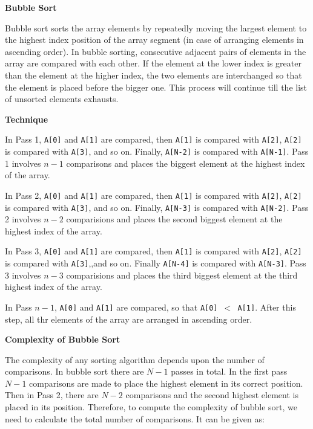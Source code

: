 \filbreak
\vskip 1cm
{\bf Bubble Sort}

\vskip 1mm
Bubble sort sorts the array elements by repeatedly moving the largest element to the highest index position of the array segment (in case of arranging elements in ascending order). In bubble sorting, consecutive adjacent pairs of elements in the array are compared with each other. If the element at the lower index is greater than the element at the higher index, the two elements are interchanged so that the element is placed before the bigger one. This process will continue till the list of unsorted elements exhausts.

\vskip 3mm
{\bf Technique}

\vskip 1mm
 In Pass 1, {\tt A[0]} and {\tt A[1]} are compared, then {\tt A[1]} is compared with {\tt A[2]}, {\tt A[2]} is compared with {\tt A[3]}, and so on. Finally, {\tt A[N-2]} is compared with {\tt A[N-1]}. Pass 1 involves $n-1$ comparisons and places the biggest element at the highest index of the array.

\vskip 3mm
 In Pass 2, {\tt A[0]} and {\tt A[1]} are compared, then {\tt A[1]} is compared with {\tt A[2]}, {\tt A[2]} is compared with {\tt A[3]}, and so on. Finally, {\tt A[N-3]} is compared with {\tt A[N-2]}. Pass 2 involves $n-2$ comparisions and places the second biggest element at the highest index of the array.

\vskip 3mm
 In Pass 3, {\tt A[0]} and {\tt A[1]} are compared, then  {\tt A[1]} is compared with {\tt A[2]}, {\tt A[2]} is compared with {\tt A[3]},,and so on. Finally {\tt A[N-4]} is compared  with {\tt A[N-3]}. Pass 3 involves $n-3$ comparisions and places the third biggest element at the third highest index of the array.

\vskip 3mm
 In Pass $n-1$, {\tt A[0]} and {\tt A[1]} are compared, so that {\tt A[0] $<$ A[1]}. After this step, all thr elements of the array are arranged in ascending order.

\vskip 3mm
{\bf Complexity of Bubble Sort}

\vskip 1mm
The complexity of any sorting algorithm depends upon the number of comparisons. In bubble sort there are $N-1$ passes in total. In the first pass $N-1$ comparisons are made to place the highest element in its correct position. Then in Pass 2, there are $N-2$ comparisons and the second highest element is placed in its position. Therefore, to compute the complexity of bubble sort, we need to calculate the total number of comparisons. It can be given as:

